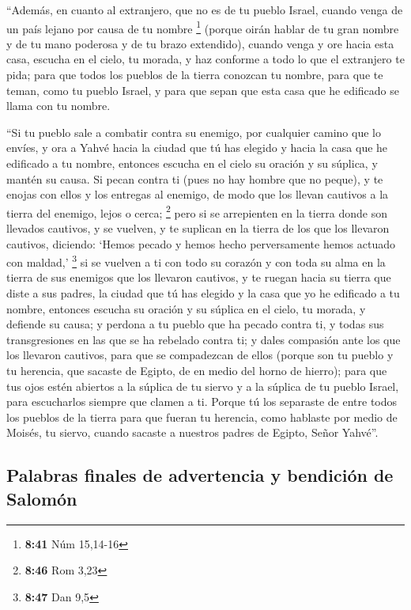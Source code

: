 \begin{paracol}{2}
 ``Además, en cuanto al extranjero, que no es de tu
pueblo Israel, cuando venga de un país lejano por causa de tu nombre
\footnote{\textbf{8:41} Núm 15,14-16}  (porque oirán
hablar de tu gran nombre y de tu mano poderosa y de tu brazo extendido),
cuando venga y ore hacia esta casa,  escucha en el cielo,
tu morada, y haz conforme a todo lo que el extranjero te pida; para que
todos los pueblos de la tierra conozcan tu nombre, para que te teman,
como tu pueblo Israel, y para que sepan que esta casa que he edificado
se llama con tu nombre.

 ``Si tu pueblo sale a combatir contra su enemigo, por
cualquier camino que lo envíes, y ora a Yahvé hacia la ciudad que tú has
elegido y hacia la casa que he edificado a tu nombre, 
entonces escucha en el cielo su oración y su súplica, y mantén su causa.
 Si pecan contra ti (pues no hay hombre que no peque), y
te enojas con ellos y los entregas al enemigo, de modo que los llevan
cautivos a la tierra del enemigo, lejos o cerca; \footnote{\textbf{8:46}
  Rom 3,23}  pero si se arrepienten en la tierra donde
son llevados cautivos, y se vuelven, y te suplican en la tierra de los
que los llevaron cautivos, diciendo: `Hemos pecado y hemos hecho
perversamente hemos actuado con maldad,' \footnote{\textbf{8:47} Dan 9,5}
 si se vuelven a ti con todo su corazón y con toda su
alma en la tierra de sus enemigos que los llevaron cautivos, y te ruegan
hacia su tierra que diste a sus padres, la ciudad que tú has elegido y
la casa que yo he edificado a tu nombre,  entonces
escucha su oración y su súplica en el cielo, tu morada, y defiende su
causa;  y perdona a tu pueblo que ha pecado contra ti, y
todas sus transgresiones en las que se ha rebelado contra ti; y dales
compasión ante los que los llevaron cautivos, para que se compadezcan de
ellos  (porque son tu pueblo y tu herencia, que sacaste
de Egipto, de en medio del horno de hierro);  para que
tus ojos estén abiertos a la súplica de tu siervo y a la súplica de tu
pueblo Israel, para escucharlos siempre que clamen a ti. 
Porque tú los separaste de entre todos los pueblos de la tierra para que
fueran tu herencia, como hablaste por medio de Moisés, tu siervo, cuando
sacaste a nuestros padres de Egipto, Señor Yahvé''.

\hypertarget{palabras-finales-de-advertencia-y-bendiciuxf3n-de-salomuxf3n}{%
\subsection{Palabras finales de advertencia y bendición de
Salomón}\label{palabras-finales-de-advertencia-y-bendiciuxf3n-de-salomuxf3n}}


\end{paracol}
